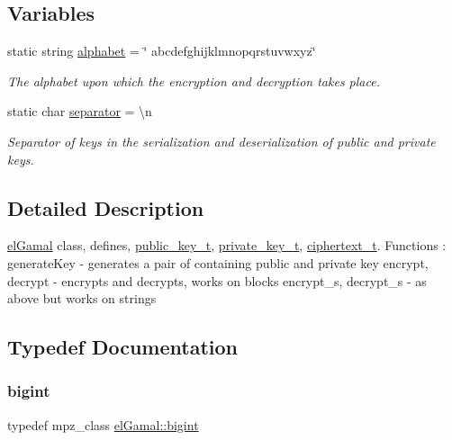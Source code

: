 \subsection*{Variables}
\begin{DoxyCompactItemize}
\item 
static string \mbox{\hyperlink{namespaceelGamal_af54bb3d0000ef0479ad0d9f9ad7b1a6a}{alphabet}} = \char`\"{} abcdefghijklmnopqrstuvwxyz\char`\"{}
\begin{DoxyCompactList}\small\item\em The alphabet upon which the encryption and decryption takes place. \end{DoxyCompactList}\item 
static char \mbox{\hyperlink{namespaceelGamal_aa6af729a807120cdf78282b9426eac01}{separator}} = \textquotesingle{}\textbackslash{}n\textquotesingle{}
\begin{DoxyCompactList}\small\item\em Separator of keys in the serialization and deserialization of public and private keys. \end{DoxyCompactList}\end{DoxyCompactItemize}


\subsection{Detailed Description}
\mbox{\hyperlink{namespaceelGamal}{el\+Gamal}} class, defines, \mbox{\hyperlink{structelGamal_1_1public__key__t}{public\+\_\+key\+\_\+t}}, \mbox{\hyperlink{structelGamal_1_1private__key__t}{private\+\_\+key\+\_\+t}}, \mbox{\hyperlink{structelGamal_1_1ciphertext__t}{ciphertext\+\_\+t}}. Functions \+: generate\+Key -\/ generates a pair of containing public and private key encrypt, decrypt -\/ encrypts and decrypts, works on blocks encrypt\+\_\+s, decrypt\+\_\+s -\/ as above but works on strings 

\subsection{Typedef Documentation}
\mbox{\label{namespaceelGamal_ab2883bf41ce8d738e2428c8ae81b0245}} 
\subsubsection{\texorpdfstring{bigint}{bigint}}
{\footnotesize\ttfamily typedef mpz\+\_\+class \mbox{\hyperlink{namespaceelGamal_ab2883bf41ce8d738e2428c8ae81b0245}{el\+Gamal\+::bigint}}}



